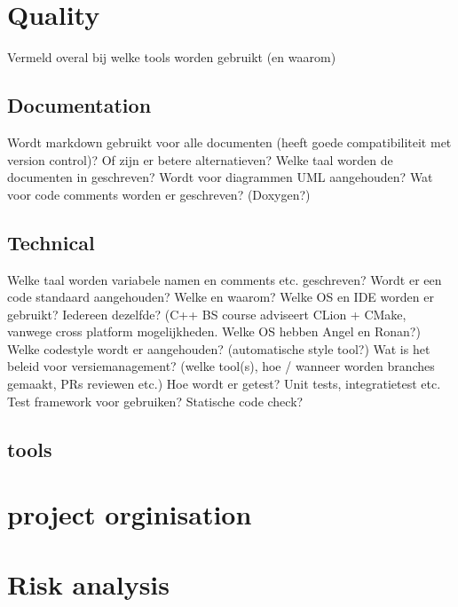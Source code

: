\documentclass{article} %
\begin{document}
    \section{Quality}
    Vermeld overal bij welke tools worden gebruikt (en waarom)
    \subsection{Documentation}
    Wordt markdown gebruikt voor alle documenten (heeft goede compatibiliteit met version control)? Of zijn er betere alternatieven?
    Welke taal worden de documenten in geschreven?
    Wordt voor diagrammen UML aangehouden?
    Wat voor code comments worden er geschreven? (Doxygen?)
    \subsection{Technical}
    Welke taal worden variabele namen en comments etc. geschreven?
    Wordt er een code standaard aangehouden? Welke en waarom?
    Welke OS en IDE worden er gebruikt? Iedereen dezelfde? (C++ BS course adviseert CLion + CMake, vanwege cross platform mogelijkheden. Welke OS hebben Angel en Ronan?)
    Welke codestyle wordt er aangehouden? (automatische style tool?)
    Wat is het beleid voor versiemanagement? (welke tool(s), hoe / wanneer worden branches gemaakt, PRs reviewen etc.)
    Hoe wordt er getest? Unit tests, integratietest etc. Test framework voor gebruiken? Statische code check?
    \subsection{tools}
    \newpage

    \section{project orginisation}
    \newpage

    \section{Risk analysis}
    \newpage
\end{document}
